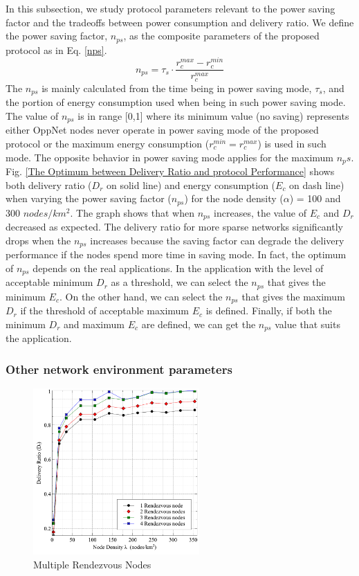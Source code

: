 In this subsection, we study protocol parameters relevant to the power saving factor and the tradeoffs between power consumption and delivery ratio.
%
We define the power saving factor, $n_{ps}$, as the composite parameters of the proposed protocol as in Eq. \ref{nps}.
%
\begin{equation}
{ n }_{ ps }={ \tau  }_{ s }\cdot \frac { { r }_{ c }^{ max }-{ r }_{ c }^{ min } }{ { r }_{ c }^{ max } } 
\label{nps}
\end{equation}
The $n_{ps}$ is mainly calculated from the time being in power saving mode, $\tau_s$, and the portion of energy consumption used when being in such power saving mode.
%
The value of $n_{ps}$ is in range [0,1] where its minimum value (no saving) represents either OppNet nodes never operate in power saving mode of the proposed protocol or the maximum energy consumption ($r_c^{min} = r_c^{max}$) is used in such mode.
%
The opposite behavior in power saving mode applies for the maximum $n_ps$.
%
Fig. \ref{The Optimum between Delivery Ratio and protocol Performance} shows both delivery ratio ($D_r$ on solid line) and energy consumption ($E_c$ on dash line) when varying the power saving factor ($n_{ps}$) for the node density ($\alpha$) = 100 and 300 $nodes/km^2$.
%
The graph shows that when $n_{ps}$ increases, the value of $E_c$ and $D_r$ decreased as expected.
%
The delivery ratio for more sparse networks significantly drops when the $n_{ps}$ increases because the saving factor can degrade the delivery performance if the nodes spend more time in saving mode.
%
In fact, the optimum of $n_{ps}$ depends on the real applications.
%
In the application with the level of acceptable minimum $D_r$ as a threshold, we can select the $n_{ps}$ that gives the minimum $E_c$.
%
On the other hand, we can select the $n_{ps}$ that gives the maximum $D_r$ if the threshold of acceptable maximum $E_c$ is defined.
%
Finally, if both the minimum $D_r$ and maximum $E_c$ are defined, we can get the $n_{ps}$ value that suits the application.

\subsubsection{Other network environment parameters}

\begin{figure}[!t]
	\centering
	\includegraphics[width=2.5in]{Graphs/MultipleRVs.pdf}
	\caption{Multiple Rendezvous Nodes}
	\label{Multiple Rendezvous Nodes}
\end{figure}


